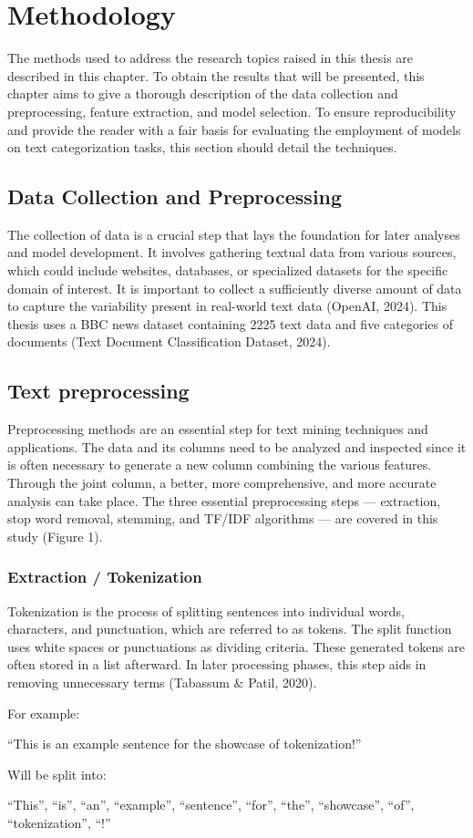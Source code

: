 \chapter{Methodology}

The methods used to address the research topics raised in this thesis are described in this chapter. To obtain the results that will be presented, this chapter aims to give a thorough description of the data collection and preprocessing, feature extraction, and model selection. To ensure reproducibility and provide the reader with a fair basis for evaluating the employment of models on text categorization tasks, this section should detail the techniques.

\section{Data Collection and Preprocessing}

The collection of data is a crucial step that lays the foundation for later analyses and model development. It involves gathering textual data from various sources, which could include websites, databases, or specialized datasets for the specific domain of interest. It is important to collect a sufficiently diverse amount of data to capture the variability present in real-world text data (OpenAI, 2024). This thesis uses a BBC news dataset containing 2225 text data and five categories of documents (Text Document Classification Dataset, 2024). 

\section{Text preprocessing}

Preprocessing methods are an essential step for text mining techniques and applications. The data and its columns need to be analyzed and inspected since it is often necessary to generate a new column combining the various features. Through the joint column, a better, more comprehensive, and more accurate analysis can take place. The three essential preprocessing steps — extraction, stop word removal, stemming, and TF/IDF algorithms — are covered in this study (Figure 1).

\subsection{Extraction / Tokenization}

Tokenization is the process of splitting sentences into individual words, characters, and punctuation, which are referred to as tokens. The split function uses white spaces or punctuations as dividing criteria. These generated tokens are often stored in a list afterward. In later processing phases, this step aids in removing unnecessary terms (Tabassum \& Patil, 2020). 

For example:

“This is an example sentence for the showcase of tokenization!”

Will be split into:

“This”, “is”, “an”, “example”, “sentence”, “for”, “the”, “showcase”, “of”, “tokenization”, “!”

